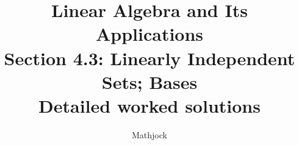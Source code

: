 
\title{\textbf{Linear Algebra and Its Applications}\\[0.3em]Section 4.3: Linearly Independent Sets; Bases\\[0.3em]\large Detailed worked solutions}
\author{Mathjock}
\date{}

\maketitle
\bookinfo
\tableofcontents
\clearpage
\renewcommand{\thesection}{4.\arabic{section}}
\renewcommand{\theHsection}{4.\arabic{section}}
\setcounter{section}{2}


